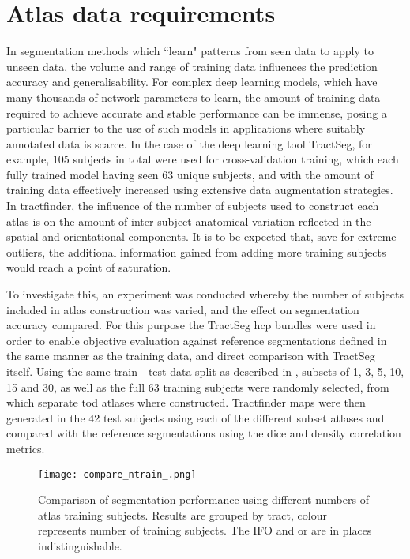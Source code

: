 \section{Atlas data requirements}\label{sec:ntrain}

In segmentation methods which ``learn" patterns from seen data to apply to unseen data, the volume and range of training data influences the prediction accuracy and generalisability.
For complex deep learning models, which have many thousands of network parameters to learn, the amount of training data required to achieve accurate and stable performance can be immense, posing a particular barrier to the use of such models in applications where suitably annotated data is scarce.
In the case of the deep learning tool TractSeg\autocite{Wasserthal2018}, for example, 105 subjects in total were used for cross-validation training, which each fully trained model having seen 63 unique subjects, and with the amount of training data effectively increased using extensive data augmentation strategies.
In tractfinder, the influence of the number of subjects used to construct each atlas is on the amount of inter-subject anatomical variation reflected in the spatial and orientational components.
It is to be expected that, save for extreme outliers, the additional information gained from adding more training subjects would reach a point of saturation.

To investigate this, an experiment was conducted whereby the number of subjects included in atlas construction was varied, and the effect on segmentation accuracy compared.
For this purpose the TractSeg \gls{hcp} bundles were used in order to enable objective evaluation against reference segmentations defined in the same manner as the training data, and direct comparison with TractSeg itself.
Using the same train - test data split as described in \textcite{Wasserthal2018b}, subsets of 1, 3, 5, 10, 15 and 30, as well as the full 63 training subjects were randomly selected, from which separate \gls{tod} atlases where constructed.
Tractfinder maps were then generated in the 42 test subjects using each of the different subset atlases and compared with the reference segmentations using the \gls{dice} and density correlation metrics.

\begin{figure}[hb!]
    \centering
    \texttt{[image: compare\_ntrain\_.png]}
    \caption{Comparison of segmentation performance using different numbers of atlas training subjects. Results are grouped by tract, colour represents number of training subjects. The IFO and \gls{or} are in places indistinguishable. }
    \label{fig:ntrain}
\end{figure}

